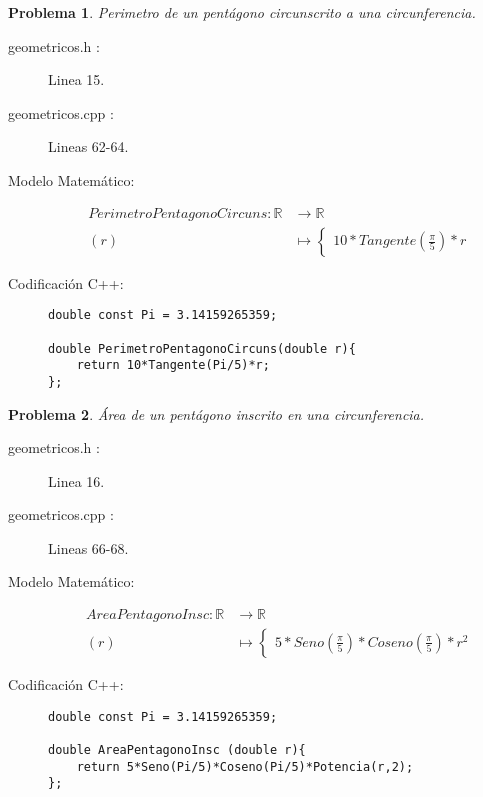 \documentclass{article}
\theoremstyle{plain}
\theoremstyle{definition}
\newtheorem{problem}{Problema}
\begin{document}
\begin{problem} \emph{Perimetro de un pentágono circunscrito a una circunferencia.}\\
\begin{description}
\item[geometricos.h :] Linea 15. \item[geometricos.cpp :] Lineas 62-64.

\item[Modelo Matemático:]
\begin{align*}
PerimetroPentagonoCircuns: \mathbb{R} &\to \mathbb{R}\\
(r) &\mapsto \begin{cases}
10*Tangente(\frac{\pi}{5})*r
\end{cases}
\end{align*}
%
\item[Codificación \textsf{C++}:]\hfill
%
\begin{verbatim}
double const Pi = 3.14159265359;

double PerimetroPentagonoCircuns(double r){
    return 10*Tangente(Pi/5)*r;
};
\end{verbatim}
\end{description}
\end{problem}

\begin{problem} \emph{Área de un pentágono inscrito en una circunferencia.}\\
\begin{description}
\item[geometricos.h :] Linea 16. \item[geometricos.cpp :] Lineas 66-68.

\item[Modelo Matemático:]
\begin{align*}
AreaPentagonoInsc: \mathbb{R} &\to \mathbb{R}\\
(r) &\mapsto \begin{cases}
5*Seno(\frac{\pi}{5})*Coseno(\frac{\pi}{5})*r^2
\end{cases}
\end{align*}
%
\item[Codificación \textsf{C++}:]\hfill
%
\begin{verbatim}
double const Pi = 3.14159265359;

double AreaPentagonoInsc (double r){
    return 5*Seno(Pi/5)*Coseno(Pi/5)*Potencia(r,2);
};
\end{verbatim}
\end{description}
\end{problem}
\end{document}
